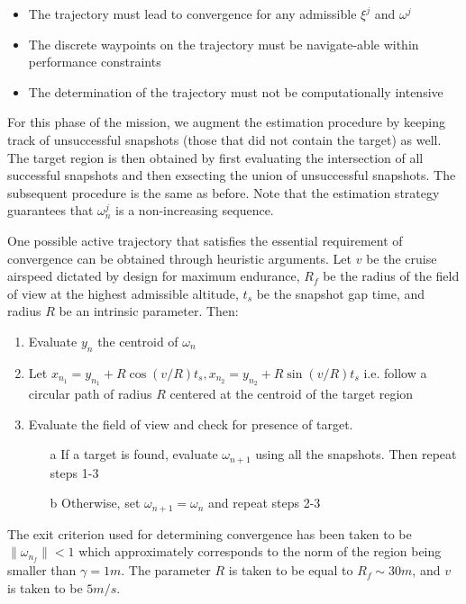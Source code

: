 \begin{itemize}
\item The trajectory must lead to convergence for any admissible $\xi^j$ and $\omega^j$
\item The discrete waypoints on the trajectory must be navigate-able within performance constraints
\item The determination of the trajectory must not be computationally intensive
\end{itemize}

For this phase of the mission, we augment the estimation procedure by keeping track of unsuccessful snapshots (those that did not contain the target) as well. The target region is then obtained by first evaluating the intersection of all successful snapshots and then exsecting the union of unsuccessful snapshots. The subsequent procedure is the same as before. Note that the estimation strategy guarantees that $\omega_n^j$ is a non-increasing sequence.

One possible active trajectory that satisfies the essential requirement of convergence can be obtained through heuristic arguments. Let $v$ be the cruise airspeed dictated by design for maximum endurance, $R_f$ be the radius of the field of view at the highest admissible altitude, $t_s$ be the snapshot gap time, and radius $R$ be an intrinsic parameter. Then:

\begin{enumerate}
\item Evaluate $y_n$ the centroid of $\omega_n$
\item Let $x_{n_1} = y_{n_1} + R \cos (v/R)t_s, x_{n_2} = y_{n_2} + R \sin (v/R)t_s$ i.e. follow a circular path of radius $R$ centered at the centroid of the target region
\item Evaluate the field of view and check for presence of target. 
  \begin{enumerate}
  \item[a] If a target is found, evaluate $\omega_{n+1}$ using all the snapshots. Then repeat steps 1-3
  \item[b] Otherwise, set $\omega_{n+1} = \omega_{n}$  and repeat steps 2-3
  \end{enumerate}
\end{enumerate}

The exit criterion used for determining convergence has been taken to be $\| \omega_{n_f} \| < 1$ which approximately corresponds to the norm of the region being smaller than $\gamma = 1m$. The parameter $R$ is taken to be equal to $R_f \sim 30m$, and $v$ is taken to be $5 m/s$.


